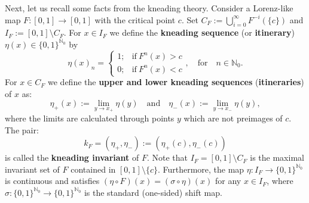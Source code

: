 \documentclass[10pt,reqno]{amsart}
\theoremstyle{plain}
\theoremstyle{assumption}
\theoremstyle{notation}
\theoremstyle{claim}
\theoremstyle{conj}
\theoremstyle{theorem}
\theoremstyle{proposition}
\theoremstyle{corollary}
\begin{document}
Next, let us recall some facts from the kneading theory. Consider a Lorenz-like map $F\colon[0,1]\to[0,1]$ with the critical point $c$. Set $C_F:=\bigcup_{i=0}^{\infty}F^{-i}(\{c\})$ and $I_F:=[0,1]\setminus C_F$. For $x\in I_F$ we define the \textbf{kneading sequence} (or \textbf{itinerary}) $\eta(x)\in\{0,1\}^{\mathbb{N}_0}$ by
$$
\eta(x)_n=
\begin{cases}
	1;&\text{if}\ F^n(x)>c\\
	0;&\text{if}\ F^n(x)<c
\end{cases},
\quad\text{for}\quad n\in\mathbb{N}_0.
$$
For $x\in C_F$ we define the \textbf{upper and lower kneading sequences} (\textbf{itineraries}) of $x$ as:
		\begin{equation}\label{eq:def_knead}
		\eta_+(x):=\lim\limits_{y\to x_+}\eta(y)\quad\text{and}\quad \eta_-(x):=\lim\limits_{y\to x_-}\eta(y),
		\end{equation}
where the limits are calculated through points $y$ which are not preimages of $c$. The pair: 
$$
k_F=(\eta_+,\eta_-):=(\eta_+(c),\eta_-(c))
$$
is called the \textbf{kneading invariant} of $F$. Note that $I_F=[0,1]\setminus C_F$ is the maximal invariant set of $F$ contained in $[0,1]\setminus\{c\}$. Furthermore, the map $\eta\colon I_F\to\{0,1\}^{\mathbb{N}_0}$ is continuous and satisfies $(\eta\circ F)(x)=(\sigma\circ\eta)(x)$ for any $x\in I_F$, where $\sigma\colon\{0,1\}^{\mathbb{N}_0}\to\{0,1\}^{\mathbb{N}_0}$ is the standard (one-sided) shift map.
\end{document}
